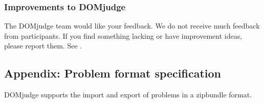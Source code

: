 \documentclass[a4paper,10pt,english,openany]{sphinxmanual}
\begin{document}
\def\sphinxLiteralBlockLabel{\label{\detokenize{team:id12}}}
\begin{sphinxVerbatim}[commandchars=\\\{\}]

\end{sphinxVerbatim}


\subsubsection{Improvements to DOMjudge}
\label{\detokenize{team:improvements-to-domjudge}}
\sphinxAtStartPar
The DOMjudge team would like your feedback. We do not receive much feedback from participants.
If you find something lacking or have improvement ideas, please report them. See .

\sphinxstepscope


\subsection{Appendix: Problem format specification}
\label{\detokenize{problem-format:appendix-problem-format-specification}}\label{\detokenize{problem-format::doc}}
\sphinxAtStartPar
DOMjudge supports the import and export of problems in a zip\sphinxhyphen{}bundle
format.
\end{document}

